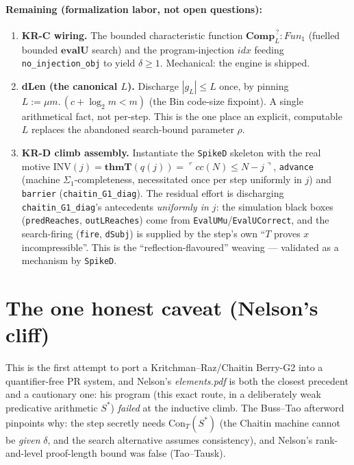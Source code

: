 \documentclass[11pt]{article}
\theoremstyle{plain}
\theoremstyle{definition}
\theoremstyle{remark}
\newcommand{\code}[1]{\ulcorner #1 \urcorner}
\newcommand{\thmT}{\mathbf{thmT}}
\newcommand{\evalU}{\mathbf{evalU}}
\newcommand{\Con}{\mathrm{Con}_T}
\newcommand{\Comp}{\mathbf{Comp}}
\begin{document}
\paragraph{Remaining (formalization labor, not open questions):}
\begin{enumerate}
\item \textbf{KR-C wiring.} The bounded characteristic function
  $\Comp_L^{\,?}:\mathit{Fun}_1$ (fuelled bounded $\evalU$ search) and the
  program-injection $\mathit{idx}$ feeding \texttt{no\_injection\_obj} to yield
  $\delta \ge 1$. Mechanical: the engine is shipped.
\item \textbf{dLen (the canonical $L$).} Discharge $|g_L| \le L$ once, by pinning
  $L := \mu m.\,(c + \log_2 m < m)$ (the Bin code-size fixpoint). A single
  arithmetical fact, not per-step. This is the one place an explicit, computable
  $L$ replaces the abandoned search-bound parameter $\rho$.
\item \textbf{KR-D climb assembly.} Instantiate the \texttt{SpikeD} skeleton with
  the real motive $\mathrm{INV}(j)=\thmT(q(j))=\code{\mathit{cc}(N)\le N-j}$,
  \texttt{advance} (machine $\Sigma_1$-completeness, necessitated once per step
  uniformly in $j$) and \texttt{barrier} (\texttt{chaitin\_G1\_diag}). The residual
  effort is discharging \texttt{chaitin\_G1\_diag}'s antecedents
  \emph{uniformly in $j$}: the simulation black boxes (\texttt{predReaches},
  \texttt{outLReaches}) come from \texttt{EvalUMu}/\texttt{EvalUCorrect}, and the
  search-firing (\texttt{fire}, \texttt{dSubj}) is supplied by the step's own ``$T$
  proves $x$ incompressible''. This is the ``reflection-flavoured'' weaving ---
  validated as a mechanism by \texttt{SpikeD}.
\end{enumerate}

\section{The one honest caveat (Nelson's cliff)}

This is the first attempt to port a Kritchman--Raz/Chaitin Berry-G2 into a
quantifier-free PR system, and Nelson's \emph{elements.pdf} is both the closest
precedent and a cautionary one: his program (this exact route, in a deliberately
weak predicative arithmetic $S^*$) \emph{failed} at the inductive climb. The
Buss--Tao afterword pinpoints why: the step secretly needs $\Con(S^*)$ (the
Chaitin machine cannot be \emph{given} $\delta$, and the search alternative
assumes consistency), and Nelson's rank-and-level proof-length bound was false
(Tao--Tausk).
\end{document}
